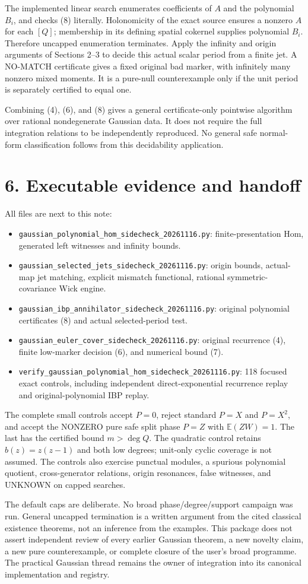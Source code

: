 \documentclass[11pt]{article}
\begin{document}
The implemented linear search enumerates coefficients of $A$ and the polynomial $B_i$, and checks (8) literally. Holonomicity of the exact source ensures a nonzero $A$ for each $[Q]$; membership in its defining spatial cokernel supplies polynomial $B_i$. Therefore uncapped enumeration terminates. Apply the infinity and origin arguments of Sections 2--3 to decide this actual scalar period from a finite jet. A NO-MATCH certificate gives a fixed original bad marker, with infinitely many nonzero mixed moments. It is a pure-null counterexample only if the unit period is separately certified to equal one.

Combining (4), (6), and (8) gives a general certificate-only pointwise algorithm over rational nondegenerate Gaussian data. It does not require the full integration relations to be independently reproduced. No general safe normal-form classification follows from this decidability application.

\section*{6. Executable evidence and handoff}
All files are next to this note:
\begin{itemize}
\item \texttt{gaussian\_polynomial\_hom\_sidecheck\_20261116.py}: finite-presentation Hom, generated left witnesses and infinity bounds.
\item \texttt{gaussian\_selected\_jets\_sidecheck\_20261116.py}: origin bounds, actual-map jet matching, explicit mismatch functional, rational symmetric-covariance Wick engine.
\item \texttt{gaussian\_ibp\_annihilator\_sidecheck\_20261116.py}: original polynomial certificates (8) and actual selected-period test.
\item \texttt{gaussian\_euler\_cover\_sidecheck\_20261116.py}: original recurrence (4), finite low-marker decision (6), and numerical bound (7).
\item \texttt{verify\_gaussian\_polynomial\_hom\_sidecheck\_20261116.py}: 118 focused exact controls, including independent direct-exponential recurrence replay and original-polynomial IBP replay.
\end{itemize}
The complete small controls accept $P=0$, reject standard $P=X$ and $P=X^2$, and accept the NONZERO pure safe split phase $P=Z$ with $\mathbb E(ZW)=1$. The last has the certified bound $m>\deg Q$. The quadratic control retains $b(z)=z(z-1)$ and both low degrees; unit-only cyclic coverage is not assumed. The controls also exercise punctual modules, a spurious polynomial quotient, cross-generator relations, origin resonances, false witnesses, and UNKNOWN on capped searches.

The default caps are deliberate. No broad phase/degree/support campaign was run. General uncapped termination is a written argument from the cited classical existence theorems, not an inference from the examples. This package does not assert independent review of every earlier Gaussian theorem, a new novelty claim, a new pure counterexample, or complete closure of the user's broad programme. The practical Gaussian thread remains the owner of integration into its canonical implementation and registry.
\end{document}
